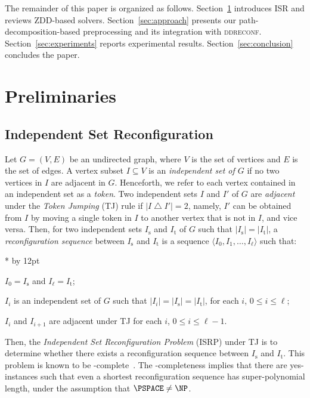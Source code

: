 \documentclass[conference]{IEEEtran}
\newenvironment{listing}[1]{%
        \begin{list}{*}{%
                 \settowidth{\labelwidth}{#1}%
                 \setlength{\leftmargin}{\labelwidth}%
                 \advance \leftmargin by 12pt
                   \setlength{\itemsep}{0pt}%
}%
}{%
\end{list}}
\newcommand{\ini}{\mathrm{s}}
\newcommand{\tar}{\mathrm{t}}
\begin{document}
The remainder of this paper is organized as follows.
Section~\ref{sec:preliminaries} introduces ISR and reviews ZDD-based solvers.
Section~\ref{sec:approach} presents our path-decomposition-based preprocessing
and its integration with \textsc{ddreconf}.
Section~\ref{sec:experiments} reports experimental results.
Section~\ref{sec:conclusion} concludes the paper.


\section{Preliminaries}
\label{sec:preliminaries}

\subsection{Independent Set Reconfiguration}
\label{subsec:isr}

Let $G=(V,E)$ be an undirected graph, where $V$ is the set of vertices and $E$
is the set of edges. A vertex subset $I\subseteq V$ is an \emph{independent set
of $G$} if no two vertices in $I$ are adjacent in $G$.
Henceforth, we refer to each vertex contained in an independent set as a
\emph{token}.
Two independent sets $I$ and $I'$ of $G$ are \emph{adjacent} under the
\emph{Token Jumping} (TJ) rule if $|I \bigtriangleup I'| = 2$, namely, $I'$ can
be obtained from $I$ by moving a single token in $I$ to another vertex that is
not in $I$, and vice versa.
Then, for two independent sets $I_\ini$ and $I_\tar$ of $G$ such that
$|I_\ini|=|I_\tar|$, a \emph{reconfiguration sequence} between $I_\ini$ and
$I_\tar$ is a sequence $\langle I_0, I_1, \ldots, I_\ell \rangle$ such that:
\begin{listing}{-}
\item[-] $I_0 = I_\ini$ and $I_\ell = I_\tar$;
\item[-] $I_i$ is an independent set of $G$ such that $|I_i| = |I_\ini| = |I_\tar|$, for each $i$, $0 \leq i \leq \ell$;
\item[-] $I_i$ and $I_{i+1}$ are adjacent under TJ for each $i$, $0 \le i \le \ell-1$.
\end{listing}
Then, the \emph{Independent Set Reconfiguration Problem} (ISRP) under TJ is to
determine whether there exists a reconfiguration sequence between $I_\ini$ and
$I_\tar$. This problem is known to be \PSPACE-complete~\cite{kamemi12}.
The \PSPACE-completeness implies that there are yes-instances such that even a
shortest reconfiguration sequence has super-polynomial length, under the
assumption that $\PSPACE \neq \NP$.
\end{document}
